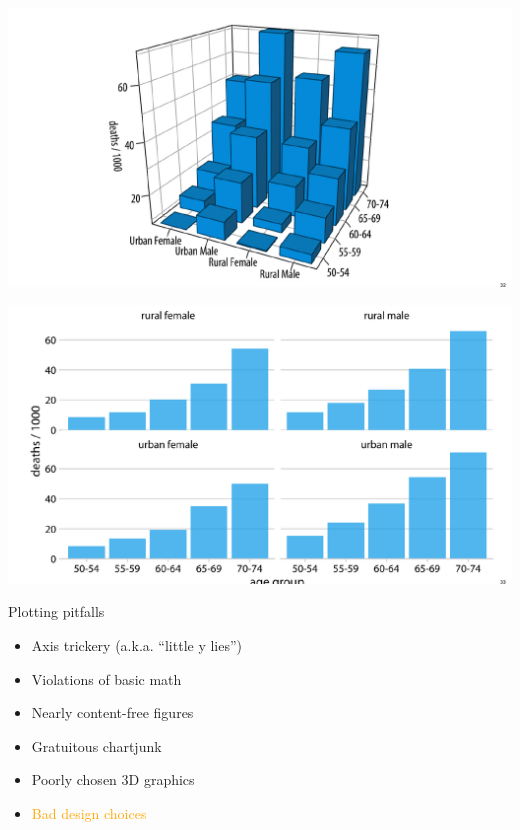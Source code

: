 \documentclass[
  ignorenonframetext,
]{beamer}
\providecommand{\tightlist}{%
  \setlength{\itemsep}{0pt}\setlength{\parskip}{0pt}}
\begin{document}
\begin{frame}{}
\protect\hypertarget{section-21}{}
\includegraphics{hallofshame_figs/fig_31.png}
\end{frame}

\begin{frame}{}
\protect\hypertarget{section-22}{}
\includegraphics{hallofshame_figs/fig_32.png}
\end{frame}

\begin{frame}{Plotting pitfalls}
\protect\hypertarget{plotting-pitfalls-5}{}
\begin{itemize}
\tightlist
\item
  Axis trickery (a.k.a. ``little y lies'')
\item
  Violations of basic math
\item
  Nearly content-free figures
\item
  Gratuitous chartjunk
\item
  Poorly chosen 3D graphics
\item
  \textcolor{orange}{Bad design choices}
\end{itemize}
\end{frame}
\end{document}
